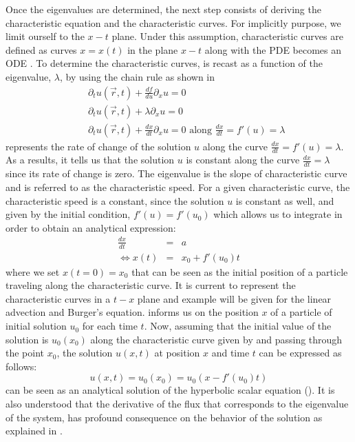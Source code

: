 Once the eigenvalues are determined, the next step consists of deriving the characteristic equation and the characteristic curves. For implicitly purpose, we limit ourself to the $x-t$ plane. Under this assumption, characteristic curves are defined as curves $x = x(t)$ in the plane $x-t$ along with the PDE becomes an ODE \cite{Toro}. To determine the characteristic curves,  is recast as a function of the eigenvalue, $\lambda$, by using the chain rule as shown in 
%
\begin{eqnarray}\label{eq:ivp3_sct1b}
&&\partial_t u(\vec{r},t) + \frac{df}{du}\partial_x u = 0 \nonumber\\
&&\partial_t u(\vec{r},t) + \lambda \partial_x u = 0 \nonumber \\
&&\partial_t u(\vec{r},t) + \frac{dx}{dt} \partial_x u = 0 \text{ along } \frac{dx}{dt} = f'(u) = \lambda 
\end{eqnarray}
%
 represents the rate of change of the solution $u$ along the curve $\frac{dx}{dt} = f'(u) = \lambda$. As a results, it tells us that the solution $u$ is constant along the curve $\frac{dx}{dt} = \lambda$ since its rate of change is zero. The eigenvalue is the slope of characteristic curve and is referred to as the characteristic speed. 
For a given characteristic curve, the characteristic speed is a constant, since the solution $u$ is constant as well, and given by the initial condition, $f'(u)=f'(u_0)$ which allows us to integrate in order to obtain an analytical expression:
%
\begin{eqnarray}\label{eq:ivp4_sct1b}
\frac{dx}{dt} &=& a \nonumber \\
\Leftrightarrow x(t) &=& x_0 + f'(u_0)t
\end{eqnarray}
%
where we set $x(t=0) = x_0$ that can be seen as the initial position of a particle traveling along the characteristic curve. It is current to represent the characteristic curves in a $t-x$ plane and example will be given for the linear advection and Burger's equation.  informs us on the position $x$ of a particle of initial solution $u_0$ for each time $t$. Now, assuming that the initial value of the solution is $u_0(x_0)$ along the characteristic curve given by  and passing through the point $x_0$, the solution $u(x,t)$ at position $x$ and time $t$ can be expressed as follows:
%
\begin{equation}\label{eq:ivp5_sct1b}
u(x,t) = u_0(x_0) = u_0(x - f'(u_0)t)
\end{equation}
%
 can be seen as an analytical solution of the hyperbolic scalar equation (). It is also understood that the derivative of the flux that corresponds to the eigenvalue of the system, has profound consequence on the behavior of the solution as explained in . 
